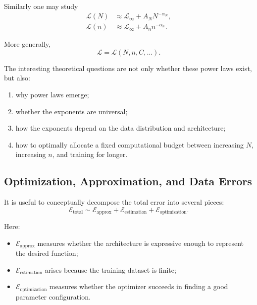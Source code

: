 Similarly one may study
\begin{align}
    \mathcal L(N)
    &\approx
    \mathcal L_\infty
    +
    A_N N^{-\alpha_N},
    \\
    \mathcal L(n)
    &\approx
    \mathcal L_\infty
    +
    A_n n^{-\alpha_n}.
\end{align}

More generally,
\begin{equation}
    \mathcal L
    =
    \mathcal L(N,n,C,\ldots).
\end{equation}

The interesting theoretical questions are not only whether these power laws
exist, but also:
\begin{enumerate}
    \item why power laws emerge;
    \item whether the exponents are universal;
    \item how the exponents depend on the data distribution and architecture;
    \item how to optimally allocate a fixed computational budget between
    increasing $N$, increasing $n$, and training for longer.
\end{enumerate}


\subsection{Optimization, Approximation, and Data Errors}

It is useful to conceptually decompose the total error into several pieces:
\begin{equation}
    \mathcal E_{\mathrm{total}}
    \sim
    \mathcal E_{\mathrm{approx}}
    +
    \mathcal E_{\mathrm{estimation}}
    +
    \mathcal E_{\mathrm{optimization}}.
\end{equation}

Here:
\begin{itemize}
    \item $\mathcal E_{\mathrm{approx}}$ measures whether the architecture is
    expressive enough to represent the desired function;

    \item $\mathcal E_{\mathrm{estimation}}$ arises because the training dataset
    is finite;

    \item $\mathcal E_{\mathrm{optimization}}$ measures whether the optimizer
    succeeds in finding a good parameter configuration.
\end{itemize}

